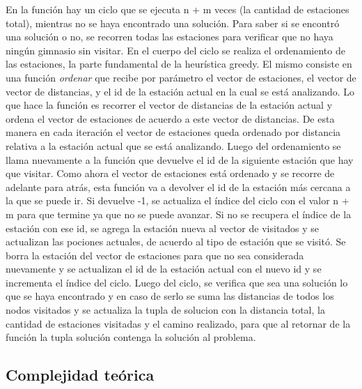             En la función hay un ciclo que se ejecuta n + m veces (la cantidad de estaciones total), mientras no se haya encontrado una solución. Para saber si se encontró una solución o no, se recorren todas las estaciones para verificar que no haya ningún gimnasio sin visitar. En el cuerpo del ciclo se realiza el ordenamiento de las estaciones, la parte fundamental de la heurística greedy. El mismo consiste en una función \textit{ordenar} que recibe por parámetro el vector de estaciones, el vector de vector de distancias, y el id de la estación actual en la cual se está analizando. Lo que hace la función es recorrer el vector de distancias de la estación actual y ordena el vector de estaciones de acuerdo a este vector de distancias. De esta manera en cada iteración el vector de estaciones queda ordenado por distancia relativa a la estación actual que se está analizando. Luego del ordenamiento se llama nuevamente a la función que devuelve el id de la siguiente estación que hay que visitar. Como ahora el vector de estaciones está ordenado y se recorre de adelante para atrás, esta función va a devolver el id de la estación más cercana a la que se puede ir. Si devuelve -1, se actualiza el índice del ciclo con el valor n + m para que termine ya que no se puede avanzar. Si no se recupera el índice de la estación con ese id, se agrega la estación nueva al vector de visitados y se actualizan las pociones actuales, de acuerdo al tipo de estación que se visitó. Se borra la estación del vector de estaciones para que no sea considerada nuevamente y se actualizan el id de la estación actual con el nuevo id y se incrementa el índice del ciclo. Luego del ciclo, se verifica que sea una solución lo que se haya encontrado y en caso de serlo se suma las distancias de todos los nodos visitados y se actualiza la tupla de solucion con la distancia total, la cantidad de estaciones visitadas y el camino realizado, para que al retornar de la función la tupla solución contenga la solución al problema. 

    \subsection{Complejidad teórica}

